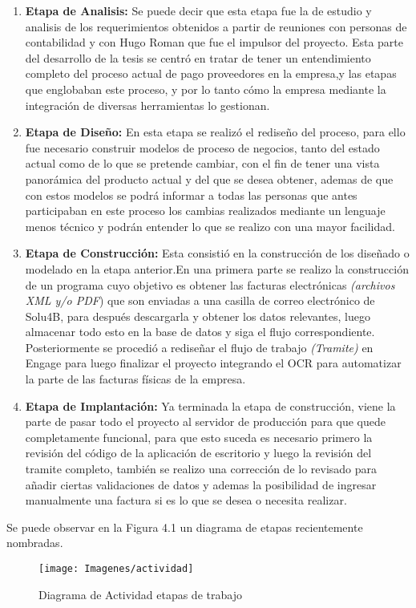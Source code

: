 	\begin{enumerate}
		\item \textbf{Etapa de Analisis:} Se puede decir que esta etapa fue la de estudio y analisis de los requerimientos obtenidos a partir de reuniones con personas de contabilidad y con Hugo Roman que fue el impulsor del proyecto. Esta parte del desarrollo de la tesis se centró en tratar de tener un entendimiento completo del proceso actual de pago proveedores en la empresa,y las etapas que englobaban este proceso, y por lo tanto cómo la empresa mediante la integración de diversas herramientas lo gestionan.
		
		\item \textbf{Etapa de Diseño:} En esta etapa se realizó el rediseño del proceso, para ello fue necesario construir modelos de proceso de negocios, tanto del estado actual como de lo que se pretende cambiar, con el fin de tener una vista panorámica del producto actual y del que se desea obtener, ademas de que con estos modelos se podrá informar a todas las personas que antes participaban en este proceso los cambias realizados mediante un lenguaje menos técnico y podrán entender lo que se realizo con una mayor facilidad.
		
		\item \textbf{Etapa de Construcción:} Esta consistió en la construcción de los diseñado o modelado en la etapa anterior.En una primera parte se realizo la construcción de un programa cuyo objetivo es obtener las facturas electrónicas \textit{(archivos XML y/o PDF}) que son enviadas a una casilla de correo electrónico de Solu4B, para después descargarla y obtener los datos relevantes, luego almacenar todo esto en la base de datos y siga el flujo correspondiente. Posteriormente se procedió a rediseñar el flujo de trabajo \textit{(Tramite)} en Engage para luego finalizar el proyecto integrando el OCR para automatizar la parte de las facturas físicas de la empresa.
		
		\item \textbf{Etapa de Implantación:} Ya terminada la etapa de construcción, viene la parte de pasar todo el proyecto al servidor de producción para que quede completamente funcional, para que esto suceda es necesario primero la revisión del código de la aplicación de escritorio y luego la revisión del tramite completo, también se realizo una corrección de lo revisado para añadir ciertas validaciones de datos y ademas la posibilidad de ingresar manualmente una factura si es lo que se desea o necesita realizar.
	\end{enumerate}
	
	Se puede observar en la Figura 4.1 un diagrama de etapas recientemente nombradas.
	
	\begin{figure}[H]
		\centering
		\texttt{[image: Imagenes/actividad]}
		\caption{Diagrama de Actividad etapas de trabajo}
	\end{figure}









